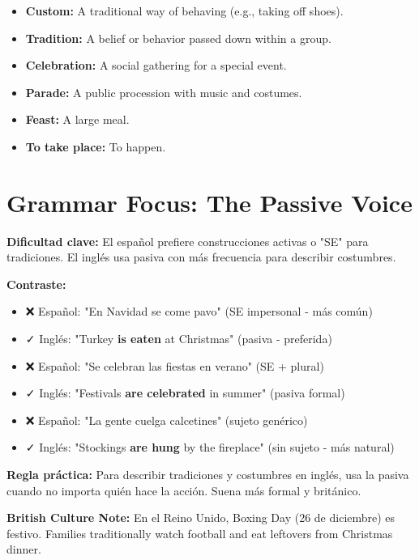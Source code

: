 \begin{vocabbox}[title=Vocabulary]
\begin{itemize}
    \item \textbf{Custom:} A traditional way of behaving (e.g., taking off shoes). 
    \item \textbf{Tradition:} A belief or behavior passed down within a group. 
    \item \textbf{Celebration:} A social gathering for a special event. 
    \item \textbf{Parade:} A public procession with music and costumes. 
    \item \textbf{Feast:} A large meal. 
    \item \textbf{To take place:} To happen. 
\end{itemize}
\end{vocabbox}

\section{Grammar Focus: The Passive Voice}

\begin{spanishbox}[title=⚠️ Para Hispanohablantes: Pasiva en Tradiciones]
\textbf{Dificultad clave:} El español prefiere construcciones activas o "SE" para tradiciones. El inglés usa pasiva con más frecuencia para describir costumbres.

\textbf{Contraste:}
\begin{itemize}
    \item ❌ Español: "En Navidad se come pavo" (SE impersonal - más común)
    \item ✓ Inglés: "Turkey \textbf{is eaten} at Christmas" (pasiva - preferida)
    \item ❌ Español: "Se celebran las fiestas en verano" (SE + plural)
    \item ✓ Inglés: "Festivals \textbf{are celebrated} in summer" (pasiva formal)
    \item ❌ Español: "La gente cuelga calcetines" (sujeto genérico)
    \item ✓ Inglés: "Stockings \textbf{are hung} by the fireplace" (sin sujeto - más natural)
\end{itemize}

\textbf{Regla práctica:} Para describir tradiciones y costumbres en inglés, usa la pasiva cuando no importa quién hace la acción. Suena más formal y británico.

\textbf{British Culture Note:} En el Reino Unido, Boxing Day (26 de diciembre) es festivo. Families traditionally watch football and eat leftovers from Christmas dinner.
\end{spanishbox}

